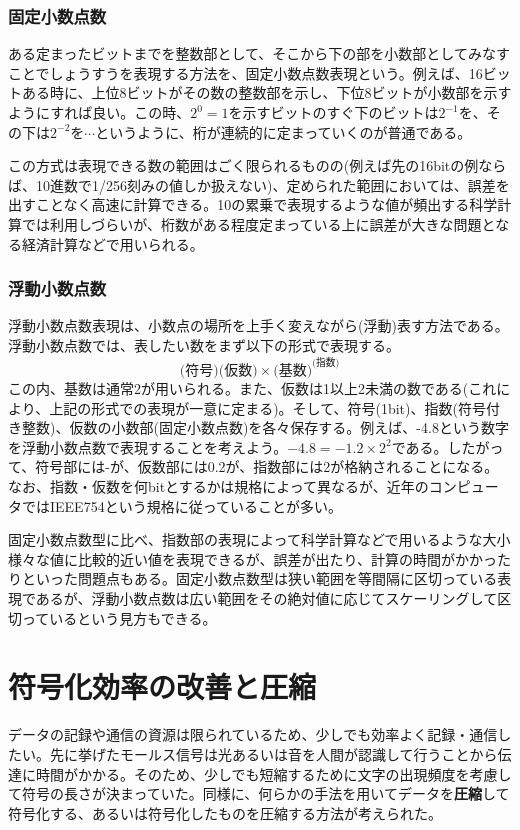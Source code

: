 \subsubsection{固定小数点数}
ある定まったビットまでを整数部として、そこから下の部を小数部としてみなすことでしょうすうを表現する方法を、固定小数点数表現という。例えば、16ビットある時に、上位8ビットがその数の整数部を示し、下位8ビットが小数部を示すようにすれば良い。この時、$2^0=1$を示すビットのすぐ下のビットは$2^{-1}$を、その下は$2^{-2}$を$\cdots$というように、桁が連続的に定まっていくのが普通である。

この方式は表現できる数の範囲はごく限られるものの(例えば先の16bitの例ならば、10進数で1/256刻みの値しか扱えない)、定められた範囲においては、誤差を出すことなく高速に計算できる。10の累乗で表現するような値が頻出する科学計算では利用しづらいが、桁数がある程度定まっている上に誤差が大きな問題となる経済計算などで用いられる。

\subsubsection{浮動小数点数}
浮動小数点数表現は、小数点の場所を上手く変えながら(浮動)表す方法である。浮動小数点数では、表したい数をまず以下の形式で表現する。
\[\text{(符号)}\text{(仮数)}\times\text{(基数)}^\text{(指数)}\]
この内、基数は通常2が用いられる。また、仮数は1以上2未満の数である(これにより、上記の形式での表現が一意に定まる)。そして、符号(1bit)、指数(符号付き整数)、仮数の小数部(固定小数点数)を各々保存する。例えば、-4.8という数字を浮動小数点数で表現することを考えよう。$-4.8=-1.2\times 2^2$である。したがって、符号部には-が、仮数部には0.2が、指数部には2が格納されることになる。なお、指数・仮数を何bitとするかは規格によって異なるが、近年のコンピュータではIEEE754という規格に従っていることが多い。

固定小数点数型に比べ、指数部の表現によって科学計算などで用いるような大小様々な値に比較的近い値を表現できるが、誤差が出たり、計算の時間がかかったりといった問題点もある。固定小数点数型は狭い範囲を等間隔に区切っている表現であるが、浮動小数点数は広い範囲をその絶対値に応じてスケーリングして区切っているという見方もできる。


\section{符号化効率の改善と圧縮}
データの記録や通信の資源は限られているため、少しでも効率よく記録・通信したい。先に挙げたモールス信号は光あるいは音を人間が認識して行うことから伝達に時間がかかる。そのため、少しでも短縮するために文字の出現頻度を考慮して符号の長さが決まっていた。同様に、何らかの手法を用いてデータを\textbf{圧縮}して符号化する、あるいは符号化したものを圧縮する方法が考えられた。

